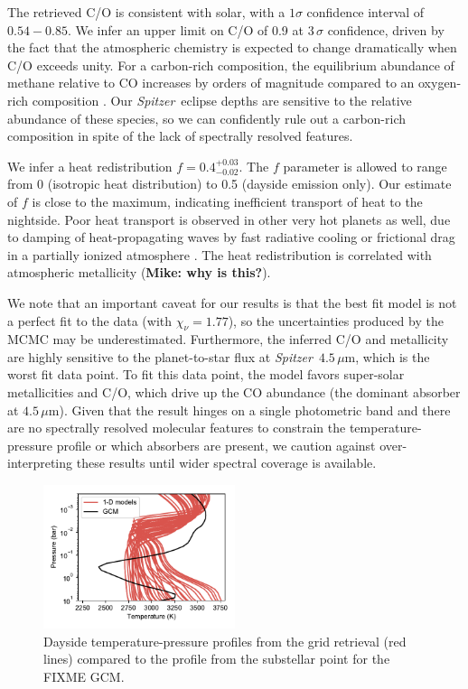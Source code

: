 \documentclass[twocolumn]{aastex61}
\newcommand{\project}[1]{\textsl{#1}}
\newcommand{\Spitzer}{\project{Spitzer}}
\begin{document}
The retrieved C/O is consistent with solar, with a $1\sigma$ confidence interval of $0.54 - 0.85$. We infer an upper limit on C/O of 0.9 at $3\,\sigma$ confidence, driven by the fact that the atmospheric chemistry is expected to change dramatically when C/O exceeds unity. For a carbon-rich composition, the equilibrium abundance of methane relative to CO increases by orders of magnitude compared to an oxygen-rich  composition \citep[e.g.][]{madhusudhan11}. Our \Spitzer\ eclipse depths are sensitive to the relative abundance of these species, so we can confidently rule out a carbon-rich composition in spite of the lack of spectrally resolved features.  

We infer a heat redistribution $f = 0.4^{+0.03}_{-0.02}$. The $f$ parameter is allowed to range from 0 (isotropic heat distribution) to 0.5 (dayside emission only). Our estimate of $f$ is close to the maximum, indicating inefficient transport of heat to the nightside. Poor heat transport is observed in other very hot planets as well, due to damping of heat-propagating waves by fast radiative cooling or frictional drag in a partially ionized atmosphere \citep{komacek16}. The heat redistribution is correlated with atmospheric metallicity (\textbf{Mike: why is this?}).  

We note that an important caveat for our results is that the best fit model is not a perfect fit to the data (with $\chi_\nu = 1.77$), so the uncertainties produced by the MCMC may be underestimated. Furthermore, the inferred C/O and metallicity are highly sensitive to the planet-to-star flux at \Spitzer\ $4.5\,\mu$m, which is the worst fit data point. To fit this data point, the model favors super-solar metallicities and C/O, which drive up the CO abundance (the dominant absorber at $4.5\,\mu$m). Given that the result hinges on a single photometric band and there are no spectrally resolved molecular features to constrain the temperature-pressure profile or which absorbers are present, we caution against over-interpreting these results until wider spectral coverage is available.

\begin{figure}
\includegraphics[width = 0.5\textwidth]{Figures/TP.pdf}
\caption{Dayside temperature-pressure profiles from the grid retrieval (red lines) compared to the profile from the substellar point for the FIXME GCM.}
\label{fig:TP}
\end{figure}
\end{document}
